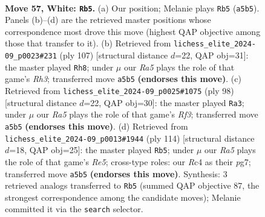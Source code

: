 \documentclass[11pt]{article}
\begin{document}
\clearpage

\begin{figure}[p]\centering
\begin{subfigure}{0.46\textwidth}\centering
\resizebox{\linewidth}{!}{%
\newchessgame
\chessboard[
  setfen={8/5p2/4p1k1/R7/P1R1P3/4KP1r/8/8 w - - 5 57},
  showmover=false,
  pgfstyle=straightmove, color=movearrow, markmove={a5-b5}
]}
\caption{}
\end{subfigure}\hfill
\begin{subfigure}{0.46\textwidth}\centering
\resizebox{\linewidth}{!}{%
\newchessgame
\chessboard[
  setfen={8/8/2R2pkr/6p1/7p/7P/5KP1/8 b - - 1 54},
  showmover=false,
  pgfstyle=straightmove, color=movearrow, markmove={h6-h8}
]}
\caption{}
\end{subfigure}
\\[4pt]
\begin{subfigure}{0.46\textwidth}\centering
\resizebox{\linewidth}{!}{%
\newchessgame
\chessboard[
  setfen={6k1/6p1/7p/8/8/5RP1/2r2PK1/8 w - - 15 50},
  showmover=false,
  pgfstyle=straightmove, color=movearrow, markmove={f3-a3}
]}
\caption{}
\end{subfigure}\hfill
\begin{subfigure}{0.46\textwidth}\centering
\resizebox{\linewidth}{!}{%
\newchessgame
\chessboard[
  setfen={8/5kp1/7p/4R2P/5P2/r3PK2/6P1/8 w - - 5 58},
  showmover=false,
  pgfstyle=straightmove, color=movearrow, markmove={e5-b5}
]}
\caption{}
\end{subfigure}
\caption{\textbf{Move 57, White: \texttt{Rb5}.} (a) Our position; Melanie plays \texttt{Rb5} (\texttt{a5b5}). Panels (b)--(d) are the retrieved master positions whose correspondence most drove this move (highest QAP objective among those that transfer to it). (b) Retrieved from \texttt{lichess\_elite\_2024-09\_p0023\#231} (ply 107) [structural distance $d$=22, QAP obj=31]: the master played \texttt{Rh8}; under $\mu$ our \emph{Ra5} plays the role of that game's \emph{Rh3}; transferred move \texttt{a5b5} \textbf{(endorses this move)}. (c) Retrieved from \texttt{lichess\_elite\_2024-09\_p0025\#1075} (ply 98) [structural distance $d$=22, QAP obj=30]: the master played \texttt{Ra3}; under $\mu$ our \emph{Ra5} plays the role of that game's \emph{Rf3}; transferred move \texttt{a5b5} \textbf{(endorses this move)}. (d) Retrieved from \texttt{lichess\_elite\_2024-09\_p0013\#1944} (ply 114) [structural distance $d$=18, QAP obj=25]: the master played \texttt{Rb5}; under $\mu$ our \emph{Ra5} plays the role of that game's \emph{Re5}; cross-type roles: our \emph{R}c4 as their \emph{p}g7; transferred move \texttt{a5b5} \textbf{(endorses this move)}. Synthesis: 3 retrieved analogs transferred to \texttt{Rb5} (summed QAP objective 87, the strongest correspondence among the candidate moves); Melanie committed it via the \texttt{search} selector.}
\label{fig:thought-m112}
\end{figure}
\end{document}
